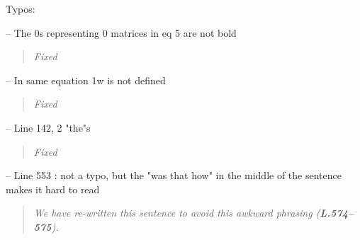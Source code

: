 \documentclass[11pt]{article}
\begin{document}
\noindent Typos:
\smallskip

\noindent-- The 0s representing 0 matrices in eq 5 are not bold
\begin{quote}
	{\itshape Fixed}
\end{quote}

\noindent-- In same equation 1w is not defined
\begin{quote}
	{\itshape Fixed}
\end{quote}

\noindent-- Line 142, 2 "the"s
\begin{quote}
	{\itshape Fixed}
\end{quote}

\noindent-- Line 553 : not a typo, but the "was that how" in the middle of the sentence makes it hard to read
\begin{quote}
	{\itshape We have re-written this sentence to avoid this awkward phrasing ({\bf L.574--575}).}
\end{quote}
\end{document}
